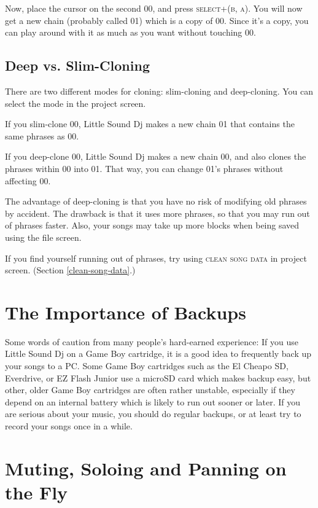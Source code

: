 Now, place the cursor on the second 00, and press \textsc{select+(b, a)}.
You will now get a new chain (probably called 01) which is a copy of 00. Since it's a copy, you can play around with it as much as you want without touching 00.

\subsection{Deep vs. Slim-Cloning}

There are two different modes for cloning: slim-cloning and deep-cloning. You can select the mode in the project screen.

If you slim-clone 00, Little Sound Dj makes a new chain 01 that
contains the same phrases as 00.

If you deep-clone 00, Little Sound Dj makes a new chain 00, and
also clones the phrases within 00 into 01. That way,
you can change 01's phrases without affecting 00.

The advantage of deep-cloning is that you have no risk of modifying old phrases by accident. The drawback is that it uses more phrases, so that you may run out of phrases faster. Also, your songs may take up more blocks when being saved using the file screen.

If you find yourself running out of phrases, try using \textsc{clean song data} in project screen. (Section \ref{clean-song-data}.)

\section{The Importance of Backups}

Some words of caution from many people's hard-earned experience: If you use Little Sound Dj on a Game Boy cartridge, it is a good idea to frequently back up your songs to a PC. Some Game Boy cartridges such as the El Cheapo SD, Everdrive, or EZ Flash Junior use a microSD card which makes backup easy, but other, older Game Boy cartridges are often rather unstable, especially if they depend on an internal battery which is likely to run out sooner or later. If you are serious about your music, you should do regular backups, or at least try to record your songs once in a while.

\section{Muting, Soloing and Panning on the Fly}

